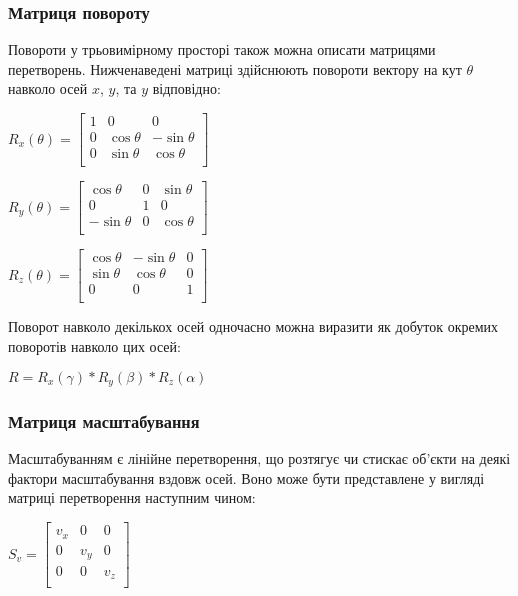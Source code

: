\subsubsection{Матриця повороту}

Повороти у трьовимірному просторі також можна описати матрицями перетворень. Нижченаведені матриці здійснюють повороти вектору на кут $\theta$ навколо осей $x$, $y$, та $y$ відповідно:

\begin{center}
  $R_x(\theta) = \begin{bmatrix}
    1 & 0 & 0 \\
    0 & \cos \theta &  -\sin \theta \\[3pt]
    0 & \sin \theta  &  \cos \theta \\[3pt]
  \end{bmatrix}$

  $R_y(\theta) = \begin{bmatrix}
    \cos \theta & 0 & \sin \theta \\[3pt]
    0 & 1 & 0 \\[3pt]
    -\sin \theta & 0 & \cos \theta \\
  \end{bmatrix}$

  $R_z(\theta) = \begin{bmatrix}
    \cos \theta &  -\sin \theta & 0 \\[3pt]
    \sin \theta & \cos \theta & 0\\[3pt]
    0 & 0 & 1\\
  \end{bmatrix}$
\end{center}

Поворот навколо декількох осей одночасно можна виразити як добуток окремих поворотів навколо цих осей:

\begin{center}
$R = R_x(\gamma) * R_y(\beta) * R_z(\alpha)$
\end{center}

\subsubsection{Матриця масштабування}

Масштабуванням є лінійне перетворення, що розтягує чи стискає об'єкти на деякі фактори масштабування вздовж осей. Воно може бути представлене у вигляді матриці перетворення наступним чином:

\begin{center}
  $S_v =
  \begin{bmatrix}
    v_x & 0 & 0  \\
    0 & v_y & 0  \\
    0 & 0 & v_z  \\
  \end{bmatrix}$
\end{center}

